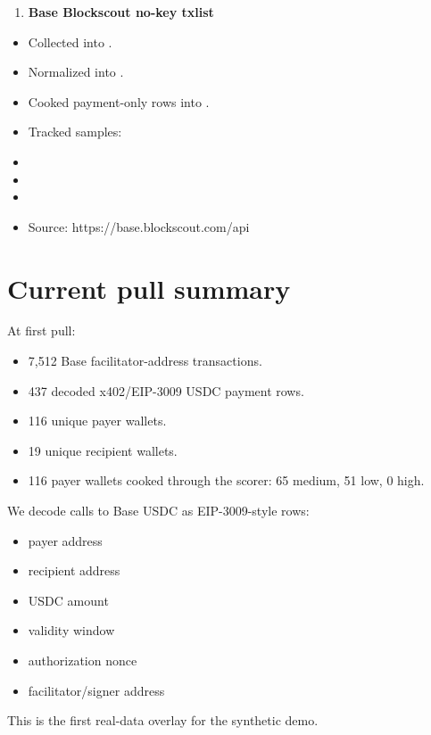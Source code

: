 \documentclass[11pt]{article}
\begin{document}
\begin{enumerate}
  \item \textbf{Base Blockscout no-key txlist}
\end{enumerate}
\begin{itemize}
  \item Collected into .
  \item Normalized into .
  \item Cooked payment-only rows into .
  \item Tracked samples:
  \item {}
  \item {}
  \item {}
  \item Source: https://base.blockscout.com/api
\end{itemize}
\section{Current pull summary}
At first pull:

\begin{itemize}
  \item 7,512 Base facilitator-address transactions.
  \item 437 decoded x402/EIP-3009 USDC payment rows.
  \item 116 unique payer wallets.
  \item 19 unique recipient wallets.
  \item 116 payer wallets cooked through the scorer: 65 medium, 51 low, 0 high.
\end{itemize}
We decode  calls to Base USDC as EIP-3009-style  rows:

\begin{itemize}
  \item payer address
  \item recipient address
  \item USDC amount
  \item validity window
  \item authorization nonce
  \item facilitator/signer address
\end{itemize}
This is the first real-data overlay for the synthetic demo.
\end{document}
